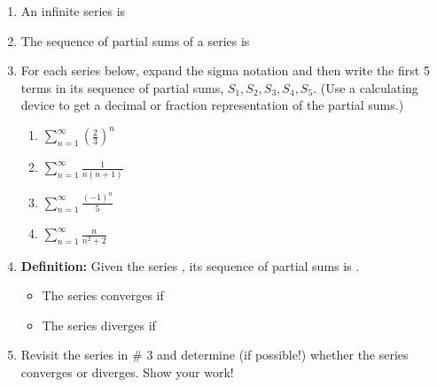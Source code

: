 \documentclass[11pt,fleqn]{article}
\begin{document}
\begin{enumerate}
\item An infinite series is 

\vspace{1in}

\item The sequence of partial sums of a series is

\vspace{1in}

\item For each series below, expand the sigma notation and then write the first 5 terms in its sequence of partial sums, $S_1, S_2, S_3,S_4, S_5.$ (Use a calculating device to get a decimal or fraction representation of the partial sums.) 
	\begin{enumerate}
	\item $\displaystyle \sum_{n=1}^\infty \left( \frac{2}{3} \right)^n$
	\vfill
	\item $\displaystyle \sum_{n=1}^\infty  \frac{1}{n(n+1)} $
	\vfill
	\newpage
	\item $\displaystyle \sum_{n=1}^\infty  \frac{(-1)^n}{5}$
	\vfill
	\item $\displaystyle \sum_{n=1}^\infty  \frac{n}{n^2+2}$
	\vfill
	\end{enumerate}

\item \textbf{Definition:} Given the series \hspace{1in} , its sequence of partial sums is \hspace{1in}.\\
\begin{itemize}
	\item The series converges if \\
	
	\item The series diverges if \\
	
\end{itemize}

\item Revisit the series in \# 3 and determine (if possible!) whether the series converges or diverges. Show your work!
\end{enumerate}
\end{document}
